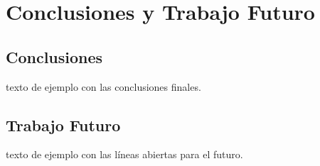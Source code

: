 \chapter{Conclusiones y Trabajo Futuro}
\label{chap:conclusiones}

\section{Conclusiones}
texto de ejemplo con las conclusiones finales.

\section{Trabajo Futuro}
texto de ejemplo con las líneas abiertas para el futuro.